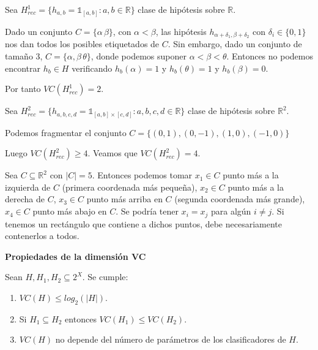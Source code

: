 \begin{example}

Sea $H^1_{rec} = \{h_{a,b} = \mathds{1}_{[a,b]}: a,b\in \mathbb{R}\}$ clase de hipótesis sobre $\mathbb{R}$. 

Dado un conjunto $C=\{\alpha\, \beta\}$, con $\alpha < \beta$, las hipótesis $h_{\alpha+\delta_1, \beta + \delta_2}$ con 
$\delta_i \in \{0,1\}$ nos dan todos los posibles etiquetados de $C$. Sin embargo, dado un conjunto de tamaño 3, 
$C=\{\alpha, \beta\, \theta\}$, donde podemos suponer $\alpha < \beta < \theta$. Entonces no podemos encontrar $h_b \in H$ 
verificando $h_b(\alpha)=1$ y $h_b(\theta) = 1$ y $h_b(\beta) = 0$.

Por tanto $VC(H^1_{rec}) = 2$.
\end{example}

\begin{example}

Sea $H^2_{rec} = \{h_{a,b,c,d} = \mathds{1}_{[a,b]\times [c,d]}: a,b,c,d\in \mathbb{R}\}$ clase de hipótesis sobre 
$\mathbb{R}^2$.

Podemos fragmentar el conjunto $C = \{(0,1), (0,-1), (1,0), (-1,0)\}$


Luego $VC(H^2_{rec}) \ge 4$. Veamos que $VC(H^2_{rec}) = 4$.

Sea $C\subseteq \mathbb{R}^2$ con $|C|=5$. Entonces podemos 
tomar $x_1 \in C$ punto más a la izquierda de $C$ (primera coordenada más pequeña), $x_2 \in C$ punto más a la derecha de 
$C$, $x_3 \in C$ punto más arriba en $C$ (segunda coordenada más grande), $x_4 \in C$ punto más abajo en $C$. Se podría 
tener $x_i = x_j$ para algún $i\neq j$. Si tenemos un rectángulo que contiene a dichos puntos, debe necesariamente contenerlos
a todos.
\end{example}



\begin{fact} \textbf{Propiedades de la dimensión VC}

Sean $H,H_1, H_2 \subseteq 2^X$. Se cumple:

\begin{enumerate}[i]
 \item $VC(H) \le log_2(|H|)$.
 \item Si $H_1 \subseteq H_2$ entonces $VC(H_1) \le VC(H_2)$.
 \item $VC(H)$ no depende del número de parámetros de los clasificadores de $H$.
\end{enumerate}
\label{fact:props-vc}
\end{fact}


